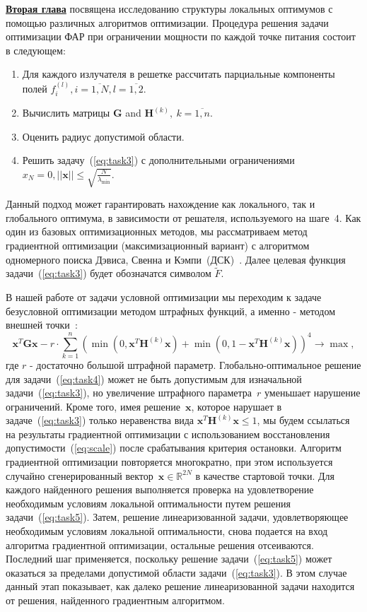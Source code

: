 \underline{\textbf{Вторая глава}} посвящена исследованию структуры локальных оптимумов с помощью различных алгоритмов оптимизации.
Процедура решения задачи оптимизации ФАР при ограничении мощности по каждой точке питания состоит в следующем:
%
\begin{enumerate}
  \item Для каждого излучателя в решетке рассчитать парциальные компоненты полей $f_i^{(l)}, i= \overline{1,N}, l=\overline{1,2}$.
  \item Вычислить матрицы $\textbf{G}$ and ${\textbf{H}}^{(k)},\ k=\overline{1,n}$.
  \item Оценить радиус допустимой области.
  \item Решить задачу~(\ref{eq:task3}) с дополнительными ограничениями $x_N = 0, ||\textbf{x}||\le \sqrt{\frac{N}{\lambda_{\min}}}$.
\end{enumerate}

Данный подход может гарантировать нахождение как локального, так и глобального оптимума, в зависимости от решателя, используемого на шаге~4. Как один из базовых оптимизационных методов, мы рассматриваем метод градиентной оптимизации (максимизационный вариант)
с алгоритмом одномерного поиска Дэвиса, Свенна и Кэмпи~(ДСК)~\cite{himmelblau:nlp}. Далее целевая функция задачи~(\ref{eq:task3}) будет обозначатся символом $\tilde{F}$.

В нашей работе от задачи условной оптимизации мы переходим к задаче безусловной оптимизации методом штрафных функций, а именно -
методом внешней точки~\cite{eremin:convex,aoki:mo}:
\begin{equation}
       \textbf{x}^{T}\textbf{Gx} - r\cdot \sum_{k=1}^n
       \left( \min\left(0,\textbf{x}^{T}\textbf{H}^{(k)}\textbf{x}\right) +
       \min\left(0,1-\textbf{x}^{T}\textbf{H}^{(k)}\textbf{x}\right)\right)^4 \rightarrow
       \max,
     \label{eq:task4}
\end{equation}
где $r$ - достаточно большой штрафной параметр. Глобально-оптимальное решение для задачи~(\ref{eq:task4}) может не быть допустимым для изначальной задачи~(\ref{eq:task3}), но увеличение штрафного параметра~$r$ уменьшает нарушение ограничений. Кроме того, имея решение~$\textbf{x}$, которое нарушает в задаче~(\ref{eq:task3}) только неравенства вида $\textbf{x}^{T}\textbf{H}^{(k)}\textbf{x} \leq 1$, мы будем ссылаться на результаты градиентной оптимизации с использованием восстановления допустимости~(\ref{eq:scale}) после срабатывания критерия остановки. Алгоритм градиентной оптимизации повторяется многократно, при этом используется случайно сгенерированный вектор~$\textbf{x}\in \mathbb{R}^{2N}$ в качестве стартовой точки. Для каждого найденного решения выполняется проверка на удовлетворение необходимым условиям локальной оптимальности путем решения задачи~(\ref{eq:task5}). Затем, решение линеаризованной задачи, удовлетворяющее  необходимым условиям локальной оптимальности, снова подается на вход алгоритма градиентной оптимизации, остальные решения отсеиваются. Последний шаг применяется, поскольку решение задачи~(\ref{eq:task5}) может оказаться за пределами допустимой области задачи~(\ref{eq:task3}). В этом случае данный этап показывает, как далеко решение линеаризованной задачи находится от решения, найденного градиентным алгоритмом.

